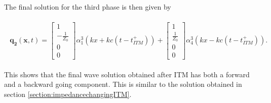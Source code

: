 The final solution for the third phase is then given by

\begin{align}
    \begin{split}
        \mathbf{q_2}\left(\mathbf{x}, t\right) = \begin{bmatrix}
            1 \\
            -\frac{1}{Z_0} \\
            0 \\
            0
        \end{bmatrix} \alpha_1^3 \left(kx + kc \left(t - t_{ITM}^+\right)\right) + 
        \begin{bmatrix}
            1 \\
            \frac{1}{Z_0} \\
            0 \\
            0
        \end{bmatrix} \alpha_4^3 \left(kx - kc \left(t - t_{ITM}^+\right)\right) .
    \end{split}
\end{align}

This shows that the final wave solution obtained after \ac{ITM} has both a forward and a backward going component. This is similar to the solution obtained in section \ref{section:impedancechangingITM}.